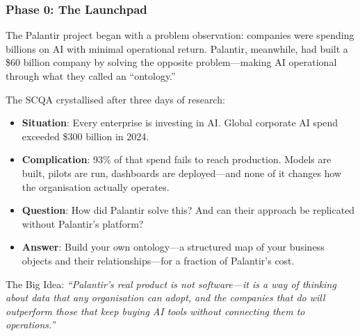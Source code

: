 \subsubsection{Phase 0: The Launchpad}

The Palantir project began with a problem observation: companies were spending billions on AI with minimal operational return. Palantir, meanwhile, had built a \$60 billion company by solving the opposite problem---making AI operational through what they called an ``ontology.''

The SCQA crystallised after three days of research:

\begin{keybox}
\begin{itemize}[leftmargin=1.2em]
  \item \textbf{Situation}: Every enterprise is investing in AI. Global corporate AI spend exceeded \$300 billion in 2024.
  \item \textbf{Complication}: 93\% of that spend fails to reach production. Models are built, pilots are run, dashboards are deployed---and none of it changes how the organisation actually operates.
  \item \textbf{Question}: How did Palantir solve this? And can their approach be replicated without Palantir's platform?
  \item \textbf{Answer}: Build your own ontology---a structured map of your business objects and their relationships---for a fraction of Palantir's cost.
\end{itemize}
\end{keybox}

The Big Idea: \emph{``Palantir's real product is not software---it is a way of thinking about data that any organisation can adopt, and the companies that do will outperform those that keep buying AI tools without connecting them to operations.''}

